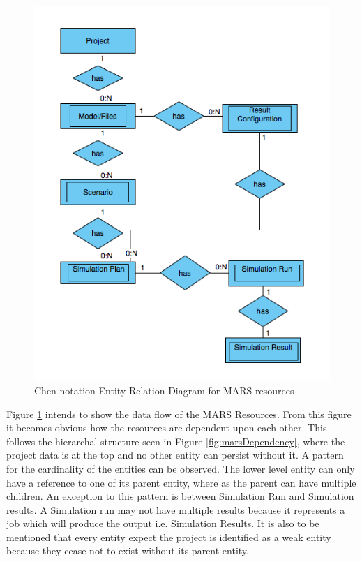         \begin{figure}[H]
            \centering \includegraphics[scale=0.6]{grafiken/ERMars.png}
            \caption{Chen notation Entity Relation Diagram for MARS resources}
            \label{fig:ERMars}
        \end{figure}
        
        Figure \ref{fig:ERMars} intends to show the data flow of the MARS Resources. From this figure it becomes obvious 
        how the resources are dependent upon each other. This follows the hierarchal structure seen in Figure \ref{fig:marsDependency},
        where the project data is at the top and no other entity can persist without it. A pattern for the cardinality of the entities can be observed.
        The lower level entity can only have a reference to one of its parent entity, where as the parent can have multiple children. An exception to this
        pattern is between Simulation Run and Simulation results. A Simulation run may not have multiple results because it represents a job which will produce
        the output i.e. Simulation Results. It is also to be mentioned that every entity expect the project is identified as a weak entity because they cease not 
        to exist without its parent entity. 

